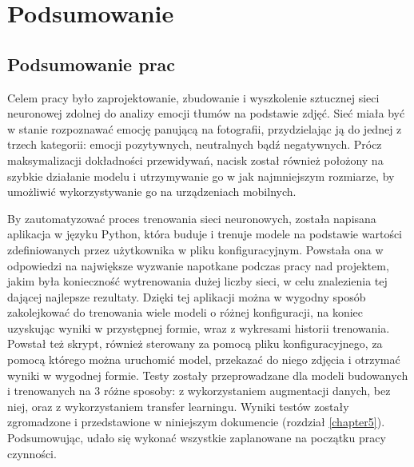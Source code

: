 \chapter{Podsumowanie}
\thispagestyle{chapterBeginStyle}
\label{chapter7}


\section{Podsumowanie prac}
Celem pracy było zaprojektowanie, zbudowanie i wyszkolenie sztucznej sieci neuronowej zdolnej do analizy emocji tłumów na podstawie zdjęć. Sieć miała być w stanie rozpoznawać emocję panującą na fotografii, przydzielając ją do jednej z trzech kategorii: emocji pozytywnych, neutralnych bądź negatywnych. Prócz maksymalizacji dokładności przewidywań, nacisk został również położony na szybkie działanie modelu i utrzymywanie go w jak najmniejszym rozmiarze, by umożliwić wykorzystywanie go na urządzeniach mobilnych.

By zautomatyzować proces trenowania sieci neuronowych, została napisana aplikacja w języku Python, która buduje i trenuje modele na podstawie wartości zdefiniowanych przez użytkownika w pliku konfiguracyjnym. Powstała ona w odpowiedzi na największe wyzwanie napotkane podczas pracy nad projektem, jakim była konieczność wytrenowania dużej liczby sieci, w celu znalezienia tej dającej najlepsze rezultaty. Dzięki tej aplikacji można w wygodny sposób zakolejkować do trenowania wiele modeli o różnej konfiguracji, na koniec uzyskując wyniki w przystępnej formie, wraz z wykresami historii trenowania.
Powstał też skrypt, również sterowany za pomocą pliku konfiguracyjnego, za pomocą którego można uruchomić model, przekazać do niego zdjęcia i otrzymać wyniki w wygodnej formie.
Testy zostały przeprowadzane dla modeli budowanych i trenowanych na 3 różne sposoby: z wykorzystaniem augmentacji danych, bez niej, oraz z wykorzystaniem transfer learningu. Wyniki testów zostały zgromadzone i przedstawione w niniejszym dokumencie (rozdział \ref{chapter5}). 
Podsumowując, udało się wykonać wszystkie zaplanowane na początku pracy czynności.


